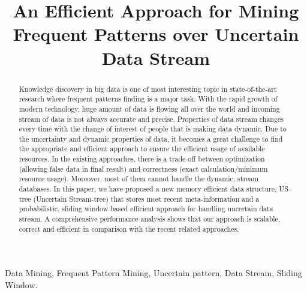 \documentclass[conference]{IEEEtran}
\begin{document}
\title{An Efficient Approach for Mining Frequent Patterns over Uncertain Data Stream}

\author{
}

\maketitle

\begin{abstract}
Knowledge discovery in big data is one of most interesting topic in state-of-the-art research where frequent patterns finding is a major task. With the rapid growth of modern technology, huge amount of data is flowing all over the world and incoming stream of data is not always accurate and precise. Properties of data stream changes every time with the change of interest of people that is making data dynamic. Due to the uncertainty and dynamic properties of data, it becomes a great challenge to find the appropriate and efficient approach to ensure the efficient usage of available resources. In the existing approaches, there is a trade-off between optimization (allowing false data in final result) and correctness (exact calculation/minimum resource usage). Moreover, most of them cannot handle the dynamic, stream databases. In this paper, we have proposed a new memory efficient data structure, US-tree (Uncertain Stream-tree) that stores most recent meta-information and a probabilistic, sliding window based efficient approach for handling uncertain data stream. A comprehensive performance analysis shows that our approach is scalable, correct and efficient in comparison with the recent related approaches.
\end{abstract}

\begin{IEEEkeywords}
Data Mining, Frequent Pattern Mining, Uncertain pattern, Data Stream, Sliding Window.
\end{IEEEkeywords}
\end{document}
